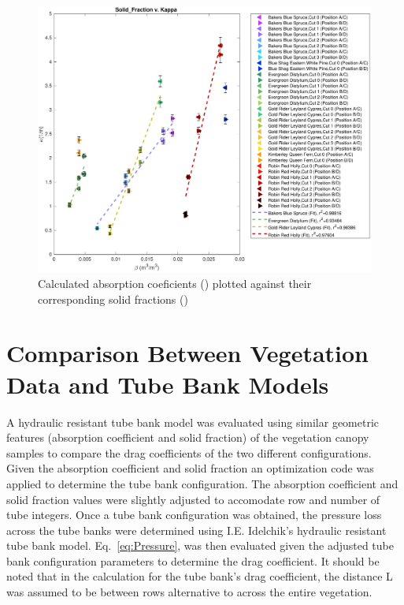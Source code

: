 \documentclass[12pt]{article}
\begin{document}
\begin{figure}[h] 
	\centering 	\includegraphics[width=0.8\linewidth]{Solid_FractionvKappa(Ave).pdf}
	\caption{Calculated absorption coeficients (\textkappa) plotted against their corresponding solid fractions (\textbeta) }
	\label{fig:betavkappa}
\end{figure}
\pagebreak

\section{Comparison Between Vegetation Data and Tube Bank Models}
\label{sec:comp}
  
A hydraulic resistant tube bank model was evaluated using similar geometric features (absorption coefficient and solid fraction) of the vegetation canopy samples to compare the drag coefficients of the two different configurations. Given the absorption coefficient and solid fraction an optimization code was applied to determine the tube bank configuration. The absorption coefficient and solid fraction values were slightly adjusted to accomodate row and number of tube integers. Once a tube bank configuration was obtained, the pressure loss across the tube banks were determined using I.E. Idelchik's hydraulic resistant tube bank model.  Eq.~\ref{eq:Pressure}, was then evaluated given the adjusted tube bank configuration parameters to determine the drag coefficient. It should be noted that in the calculation for the tube bank's drag coefficient, the distance L was assumed to be between rows alternative to across the entire vegetation.\\
\end{document}
